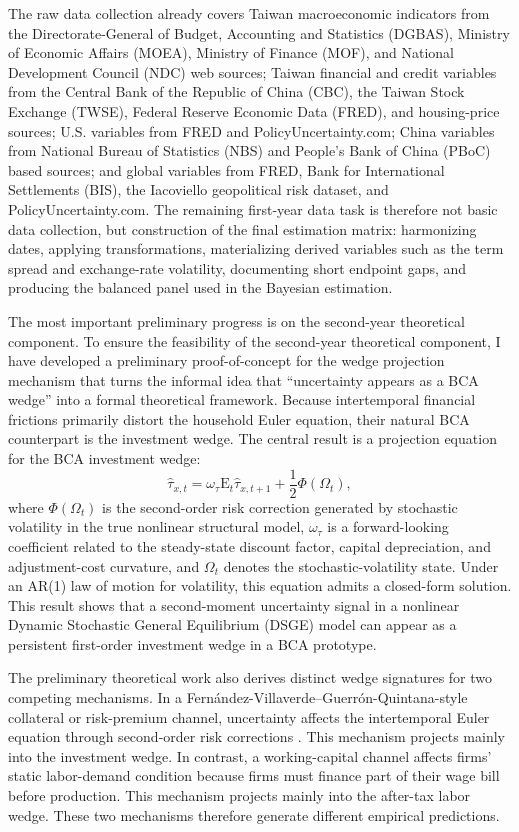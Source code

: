 \documentclass[12pt]{article}
\begin{document}
The raw data collection already covers Taiwan macroeconomic indicators from the
Directorate-General of Budget, Accounting and Statistics (DGBAS), Ministry of Economic
Affairs (MOEA), Ministry of Finance (MOF), and National Development Council (NDC) web
sources; Taiwan financial and credit variables from the Central Bank of the Republic of China
(CBC), the Taiwan Stock Exchange (TWSE), Federal Reserve Economic Data (FRED), and
housing-price sources; U.S. variables from FRED and PolicyUncertainty.com; China variables
from National Bureau of Statistics (NBS) and People's Bank of China (PBoC) based sources; and
global variables from FRED, Bank for International Settlements (BIS), the Iacoviello geopolitical
risk dataset, and PolicyUncertainty.com. The remaining first-year data task is therefore not basic data collection,
but construction of the final estimation matrix: harmonizing dates, applying transformations,
materializing derived variables such as the term spread and exchange-rate volatility, documenting
short endpoint gaps, and producing the balanced panel used in the Bayesian estimation.

The most important preliminary progress is on the second-year theoretical component. To ensure the feasibility of the second-year theoretical component, I have developed a preliminary proof-of-concept for the wedge projection mechanism that turns the informal idea that
``uncertainty appears as a BCA wedge'' into a formal theoretical framework. Because
intertemporal financial frictions primarily distort the household Euler equation, their natural
BCA counterpart is the investment wedge. The central result is a projection equation for the BCA
investment wedge:
\[
\hat{\tau}_{x,t}
=
\omega_\tau \mathrm{E}_t \hat{\tau}_{x,t+1}
+
\frac{1}{2}\Phi(\Omega_t),
\]
where $\Phi(\Omega_t)$ is the second-order risk correction generated by stochastic volatility in
the true nonlinear structural model, $\omega_\tau$ is a forward-looking coefficient related to
the steady-state discount factor, capital depreciation, and adjustment-cost curvature, and
$\Omega_t$ denotes the stochastic-volatility state. Under an AR(1) law of motion for volatility,
this equation admits a closed-form solution. This result shows that a second-moment uncertainty
signal in a nonlinear Dynamic Stochastic General Equilibrium (DSGE) model can appear as a
persistent first-order investment wedge in a BCA prototype.

The preliminary theoretical work also derives distinct wedge signatures for two competing
mechanisms. In a Fern\'andez-Villaverde--Guerr\'on-Quintana-style collateral or risk-premium
channel, uncertainty affects the intertemporal Euler equation through second-order risk
corrections \citep{fernandez-villaverde2011risk,fernandez-villaverde2020uncertainty}. This
mechanism projects mainly into the investment wedge. In contrast, a working-capital channel affects firms' static
labor-demand condition because firms must finance part of their wage bill before production.
This mechanism projects mainly into the after-tax labor wedge. These two mechanisms therefore
generate different empirical predictions.
\end{document}
